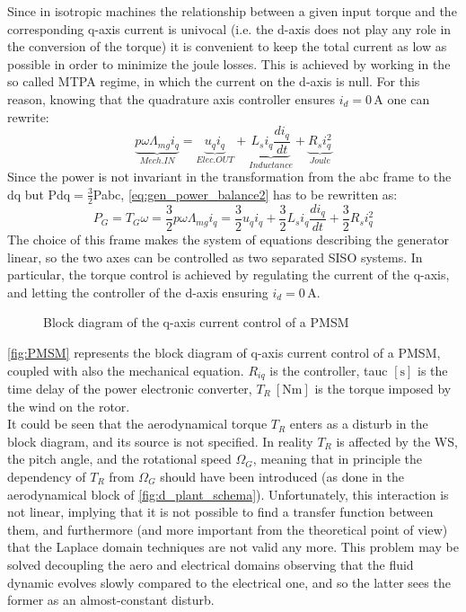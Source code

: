 Since in isotropic machines the relationship between a given input torque and the corresponding q-axis current is univocal (i.e. the d-axis does not play any role in the conversion of the torque) it is convenient to keep the total current as low as possible in order to minimize the joule losses. This is achieved by working in the so called \acrfull{MTPA} regime, in which the current on the d-axis is null. For this reason, knowing that the quadrature axis controller ensures $i_d=0 \, \si{\ampere}$ one can rewrite:
\begin{equation}
  \underbrace{p\omega\Lambda_{mg}i_q}_{Mech. IN} = \underbrace{u_qi_q}_{Elec. OUT}+ \underbrace{L_{s} i_q\frac{di_q}{dt}}_{Inductance} + \underbrace{R_{s}i_q^2}_{Joule}
  \label{eq:gen_power_balance2}
\end{equation}
Since the power is not invariant in the transformation from the abc frame to the dq but \acrshort{Pdq}$= \frac{3}{2}$\acrshort{Pabc}, \autoref{eq:gen_power_balance2} has to be rewritten as:
\begin{equation}
  P_G = T_G\omega = \frac{3}{2}p\omega\Lambda_{mg}i_q = \frac{3}{2}u_qi_q + \frac{3}{2}L_{s} i_q\frac{di_q}{dt} + \frac{3}{2}R_{s} i_q^2
  \label{eq:gen_power_balance3}
\end{equation}
The choice of this frame makes the system of equations describing the generator linear, so the two axes can be controlled as two separated \acrfull{SISO} systems. In particular, the torque control is achieved by regulating the current of the q-axis, and letting the controller of the d-axis ensuring $i_d=0 \, \si{\ampere}$.
\begin{figure}[htb]

\caption{Block diagram of the q-axis current control of a PMSM}
\label{fig:PMSM}
\end{figure}

\autoref{fig:PMSM} represents the block diagram of q-axis current control of a \acrshort{PMSM}, coupled with also the mechanical equation. $R_{iq}$ is the controller, \acrshort{tauc} $\left[\si{\second}\right]$ is the time delay of the power electronic converter, $T_R \ \left[\si{\newton\meter}\right]$ is the torque imposed by the wind on the rotor.\\
It could be seen that the aerodynamical torque $T_R$ enters as a disturb in the block diagram, and its source is not specified. In reality $T_R$ is affected by the \acrshort{WS}, the pitch angle, and the rotational speed $\Omega_G$, meaning that in principle the dependency of $T_R$ from $\Omega_G$ should have been introduced (as done in the aerodynamical block of \autoref{fig:d_plant_schema}). Unfortunately, this interaction is not linear, implying that it is not possible to find a transfer function between them, and furthermore (and more important from the theoretical point of view) that the Laplace domain techniques are not valid any more. This problem may be solved decoupling the aero and electrical domains observing that the fluid dynamic evolves slowly compared to the electrical one, and so the latter sees the former as an almost-constant disturb. 

